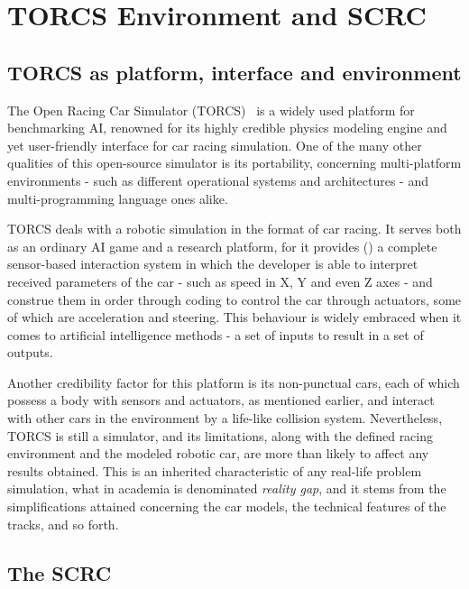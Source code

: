 \section{\textbf{TORCS Environment and SCRC}} \label{sec:torcs}

\subsection{TORCS as platform, interface and environment}

	The Open Racing Car Simulator (TORCS)~\cite{TORCS} is a widely used platform for benchmarking AI, renowned for
	its	highly credible physics modeling engine and yet user-friendly interface for car racing simulation. One of
	the	many other qualities of this open-source simulator is its portability, concerning multi-platform environments
	- such as different operational systems and architectures - and multi-programming language ones alike.
	
	TORCS deals with a robotic simulation in the format of car racing. It serves both as an ordinary AI game and a
	research platform, for it provides () a complete sensor-based interaction system in which the developer is able to
	interpret received parameters of the car - such as speed in X, Y and even Z axes - and construe them in order through
	coding to control the car through actuators, some of which are acceleration and steering. This behaviour is
	widely embraced when it comes to artificial intelligence methods - a set of inputs to result in a set of outputs.
	
	Another credibility factor for this platform is its non-punctual cars, each of which possess a body with sensors
	and actuators, as mentioned earlier, and interact with other cars in the environment by a life-like collision
	system. Nevertheless, TORCS is still a simulator, and its limitations, along with the defined racing environment
	and the modeled robotic car, are more than likely to affect any results obtained. This is an inherited
	characteristic of any real-life problem simulation, what in academia is denominated \emph{reality gap}, and it
	stems from the simplifications attained concerning the car models, the technical features of the tracks, and so
	forth.

\subsection{The SCRC}

